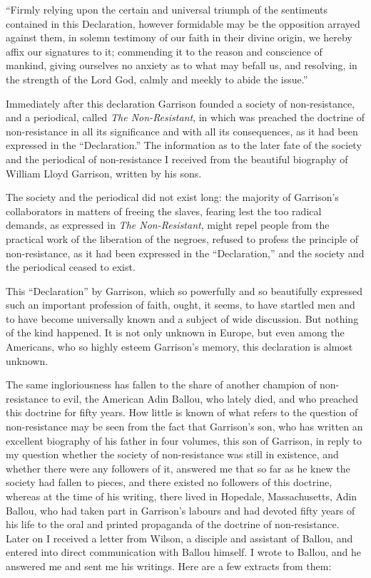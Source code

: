 \documentclass{book}
\begin{document}
“Firmly relying upon the certain and universal triumph of the sentiments contained in this Declaration, however formidable may be the opposition arrayed against them, in solemn testimony of our faith in their divine origin, we hereby affix our signatures to it; commending it to the reason and conscience of mankind, giving ourselves no anxiety as to what may befall us, and resolving, in the strength of the Lord God, calmly and meekly to abide the issue.”

Immediately after this declaration Garrison founded a society of non-resistance, and a periodical, called \emph{The Non-Resistant}, in which was preached the doctrine of non-resistance in all its significance and with all its consequences, as it had been expressed in the “Declaration.” The information as to the later fate of the society and the periodical of non-resistance I received from the beautiful biography of William Lloyd Garrison, written by his sons.

The society and the periodical did not exist long: the majority of Garrison’s collaborators in matters of freeing the slaves, fearing lest the too radical demands, as expressed in \emph{The Non-Resistant}, might repel people from the practical work of the liberation of the negroes, refused to profess the principle of non-resistance, as it had been expressed in the “Declaration,” and the society and the periodical ceased to exist.

This “Declaration” by Garrison, which so powerfully and so beautifully expressed such an important profession of faith, ought, it seems, to have startled men and to have become universally known and a subject of wide discussion. But nothing of the kind happened. It is not only unknown in Europe, but even among the Americans, who so highly esteem Garrison’s memory, this declaration is almost unknown.

The same ingloriousness has fallen to the share of another champion of non-resistance to evil, the American Adin Ballou, who lately died, and who preached this doctrine for fifty years. How little is known of what refers to the question of non-resistance may be seen from the fact that Garrison’s son, who has written an excellent biography of his father in four volumes, this son of Garrison, in reply to my question whether the society of non-resistance was still in existence, and whether there were any followers of it, answered me that so far as he knew the society had fallen to pieces, and there existed no followers of this doctrine, whereas at the time of his writing, there lived in Hopedale, Massachusetts, Adin Ballou, who had taken part in Garrison’s labours and had devoted fifty years of his life to the oral and printed propaganda of the doctrine of non-resistance. Later on I received a letter from Wilson, a disciple and assistant of Ballou, and entered into direct communication with Ballou himself. I wrote to Ballou, and he answered me and sent me his writings. Here are a few extracts from them:
\end{document}
